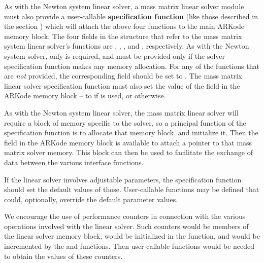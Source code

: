 \documentclass[letterpaper,10pt,english]{sphinxmanual}
\begin{document}
As with the Newton system linear solver, a mass matrix linear solver
module must also provide a user-callable \textbf{specification function} (like
those described in the section {\hyperref[c_interface/User_callable:cinterface-linearsolvers]{\emph{}}}) which
will attach the above four functions to the main ARKode memory
block.  The four fields in the  structure that refer to
the mass matrix system linear solver's functions are ,
, , and , respectively.  As
with the Newton system solver, only {\hyperref[linear_solvers/custom:c.msolve]{\emph{}}} is required,
and {\hyperref[linear_solvers/custom:c.mfree]{\emph{}}} must be provided only if the solver
specification function makes any memory allocation.  For any of the
functions that are \emph{not} provided, the corresponding field should be
set to .  The mass matrix linear solver specification function
must also set the value of the field  in the
ARKode memory block -- to  if {\hyperref[linear_solvers/custom:c.msetup]{\emph{}}} is used, or
 otherwise.

As with the Newton system linear solver, the mass matrix linear solver
will require a block of memory specific to the solver, so a principal
function of the specification function is to allocate that memory
block, and initialize it.  Then the field  in the
ARKode memory block  is available to attach a pointer to
that mass matrix solver memory.  This block can then be used to
facilitate the exchange of data between the various interface functions.

If the linear solver involves adjustable parameters, the specification
function should set the default values of those.  User-callable
functions may be defined that could, optionally, override the default
parameter values.

We encourage the use of performance counters in connection with the various
operations involved with the linear solver.  Such counters would be
members of the linear solver memory block, would be initialized in the
{\hyperref[linear_solvers/custom:c.minit]{\emph{}}} function, and would be incremented by the
{\hyperref[linear_solvers/custom:c.msetup]{\emph{}}} and {\hyperref[linear_solvers/custom:c.msolve]{\emph{}}} functions.  Then
user-callable functions would be needed to obtain the values of these
counters.
\end{document}
